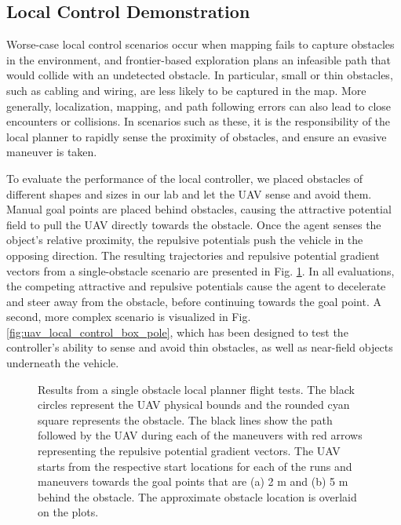 \documentclass[letterpaper, 10 pt, conference]{ieeeconf}  %
\begin{document}
\subsection{Local Control Demonstration}

Worse-case local control scenarios occur when mapping fails to capture obstacles in the environment, and frontier-based exploration plans an infeasible path that would collide with an undetected obstacle. In particular, small or thin obstacles, such as cabling and wiring, are less likely to be captured in the map. More generally, localization, mapping, and path following errors can also lead to close encounters or collisions. In scenarios such as these, it is the responsibility of the local planner to rapidly sense the proximity of obstacles, and ensure an evasive maneuver is taken. 

To evaluate the performance of the local controller, we placed obstacles of different shapes and sizes in our lab and let the UAV sense and avoid them. Manual goal points are placed behind obstacles, causing the attractive potential field to pull the UAV directly towards the obstacle. Once the agent senses the object's relative proximity, the repulsive potentials push the vehicle in the opposing direction. The resulting trajectories and repulsive potential gradient vectors from a single-obstacle scenario are presented in Fig. \ref{fig:uav_local_control_tripod}. In all evaluations, the competing attractive and repulsive potentials cause the agent to decelerate and steer away from the obstacle, before continuing towards the goal point. A second, more complex scenario is visualized in Fig. \ref{fig:uav_local_control_box_pole}, which has been designed to test the controller's ability to sense and avoid thin obstacles, as well as near-field objects underneath the vehicle.
		
\begin{figure}[h!]
		\centering
		\hspace{1pt}
		\newline
		\caption{Results from a single obstacle local planner flight tests. The black circles represent the UAV physical bounds and the rounded cyan square represents the obstacle. The black lines show the path followed by the UAV during each of the maneuvers with red arrows representing the repulsive potential gradient vectors. The UAV starts from the respective start locations for each of the runs and maneuvers towards the goal points that are (a) 2 m and (b) 5 m behind the obstacle. The approximate obstacle location is overlaid on the plots.}
		\label{fig:uav_local_control_tripod}
\end{figure}
\end{document}
